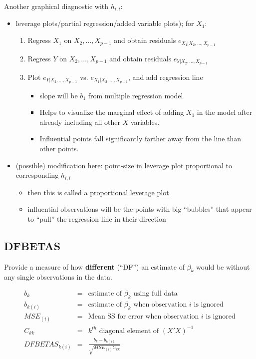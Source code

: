 \documentclass[12pt]{notes}
\begin{document}
\nspace
Another graphical diagnostic with $h_{i,i}$:
\begin{itemize}
 \item leverage plots/partial regression/added variable plots); for $X_1$:
   \begin{enumerate}
     \item Regress $X_1$ on $X_2, \ldots, X_{p-1}$ and obtain residuals $e_{X_1 | X_2, \ldots, X_{p-1}}$
     \item Regress $Y$ on $X_2, \ldots, X_{p-1}$ and obtain residuals $e_{Y | X_2, \ldots, X_{p-1}}$
     \item Plot $e_{Y | X_2, \ldots, X_{p-1}}$ vs. $e_{X_1 | X_2, \ldots, X_{p-1}}$, and add regression line
       \begin{itemize}
         \item slope will be $b_1$ from multiple regression model
         \item Helps to visualize the marginal effect of adding $X_1$ in the model after already including all other $X$ variables. 
         \item Influential points fall significantly farther away from the line than other points. 
       \end{itemize}
   \end{enumerate}
 \item (possible) modification here: point-size in leverage plot proportional to corresponding $h_{i,i}$ %
   \begin{itemize}
     \item then this is called a \underline{proportional leverage plot}
     \item influential observations will be the points with big ``bubbles'' that appear to ``pull''
      the regression line in their direction
   \end{itemize}
\end{itemize}

\subsection{DFBETAS} 
Provide a measure of how \textbf{different} (``DF'') an estimate of $\beta_k$ would be without any single observations in the data. 

    \begin{eqnarray}
       b_k & = & \mbox{estimate of $\beta_k$ using full data} \nonumber \\
       b_{k(i)} & = & \mbox{estimate of $\beta_k$ when observation $i$ is ignored} \nonumber \\
       MSE_{(i)} & = & \mbox{Mean SS for error when observation $i$ is ignored} \nonumber \\
       C_{kk} & = & \mbox{$k^{th}$ diagonal element of } \left( {X}' {X} \right) ^{-1} \nonumber\\
       DFBETAS_{k(i)} & = & \frac{b_k-b_{k(i)}}{\sqrt{MSE_{(i)}C_{kk}}} \nonumber
     \end{eqnarray}
     
\end{document}

